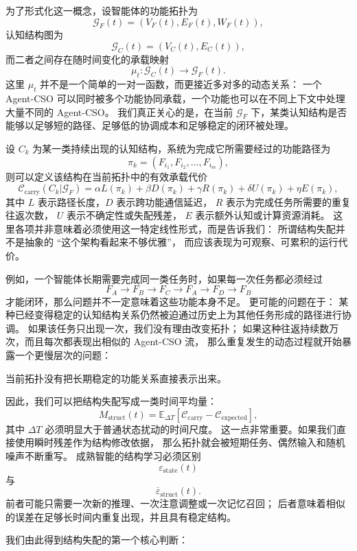 为了形式化这一概念，设智能体的功能拓扑为
\[
\mathcal G_F(t)
=
\left(
V_F(t),
E_F(t),
W_F(t)
\right),
\]
认知结构图为
\[
\mathcal G_C(t)
=
\left(
V_C(t),
E_C(t)
\right),
\]
而二者之间存在随时间变化的承载映射
\[
\mu_t:
\mathcal G_C(t)
\rightarrow
\mathcal G_F(t).
\]
这里 $\mu_t$ 并不是一个简单的一对一函数，而更接近多对多的动态关系：
一个 Agent-CSO 可以同时被多个功能协同承载，一个功能也可以在不同上下文中处理大量不同的 Agent-CSO。
我们真正关心的是，在当前 $\mathcal G_F$ 下，某类认知结构是否能够以足够短的路径、足够低的协调成本和足够稳定的闭环被处理。

设 $C_k$ 为某一类持续出现的认知结构，系统为完成它所需要经过的功能路径为
\[
\pi_k
=
(F_{i_1},F_{i_2},\ldots,F_{i_m}),
\]
则可以定义该结构在当前拓扑中的有效承载代价
\[
\mathcal C_{\mathrm{carry}}(C_k|\mathcal G_F)
=
\alpha L(\pi_k)
+
\beta D(\pi_k)
+
\gamma R(\pi_k)
+
\delta U(\pi_k)
+
\eta E(\pi_k),
\]
其中 $L$ 表示路径长度，$D$ 表示跨功能通信延迟，
$R$ 表示为完成任务所需要的重复往返次数，
$U$ 表示不确定性或失配残差，
$E$ 表示额外认知或计算资源消耗。
这里各项并非意味着必须使用这一特定线性形式，而是告诉我们：
所谓结构失配并不是抽象的 ``这个架构看起来不够优雅''，
而应该表现为可观察、可累积的运行代价。

例如，一个智能体长期需要完成同一类任务时，如果每一次任务都必须经过
\[
F_A
\rightarrow
F_B
\rightarrow
F_C
\rightarrow
F_A
\rightarrow
F_D
\rightarrow
F_B
\]
才能闭环，那么问题并不一定意味着这些功能本身不足。
更可能的问题在于：
某种已经变得稳定的认知结构关系仍然被迫通过历史上为其他任务形成的路径进行协调。
如果该任务只出现一次，我们没有理由改变拓扑；
如果这种往返持续数万次，而且每次都表现出相似的 Agent-CSO 流，
那么重复发生的动态过程就开始暴露一个更慢层次的问题：
\begin{statementbox}
当前拓扑没有把长期稳定的功能关系直接表示出来。
\end{statementbox}

因此，我们可以把结构失配写成一类时间平均量：
\[
M_{\mathrm{struct}}(t)
=
\mathbb E_{\Delta T}
\left[
\mathcal C_{\mathrm{carry}}
-
\mathcal C_{\mathrm{expected}}
\right],
\]
其中 $\Delta T$ 必须明显大于普通状态扰动的时间尺度。
这一点非常重要。如果我们直接使用瞬时残差作为结构修改依据，
那么拓扑就会被短期任务、偶然输入和随机噪声不断重写。
成熟智能的结构学习必须区别
\[
\varepsilon_{\mathrm{state}}(t)
\]
与
\[
\overline{\varepsilon}_{\mathrm{struct}}(t).
\]
前者可能只需要一次新的推理、一次注意调整或一次记忆召回；
后者意味着相似的误差在足够长时间内重复出现，并且具有稳定结构。

我们由此得到结构失配的第一个核心判断：


